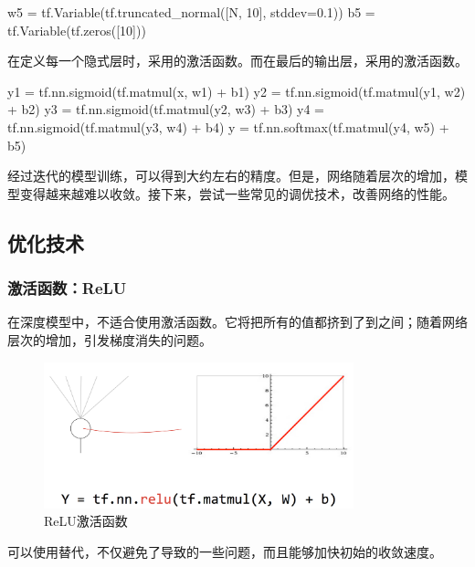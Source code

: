 \begin{content}
\begin{leftbar}
\begin{python}
w5 = tf.Variable(tf.truncated_normal([N, 10], stddev=0.1)) 
b5 = tf.Variable(tf.zeros([10]))
\end{python}
\end{leftbar}

在定义每一个隐式层时，采用的激活函数。而在最后的输出层，采用的激活函数。

\begin{leftbar}
\begin{python}
y1 = tf.nn.sigmoid(tf.matmul(x,  w1) + b1)
y2 = tf.nn.sigmoid(tf.matmul(y1, w2) + b2)
y3 = tf.nn.sigmoid(tf.matmul(y2, w3) + b3)
y4 = tf.nn.sigmoid(tf.matmul(y3, w4) + b4)
y  = tf.nn.softmax(tf.matmul(y4, w5) + b5)
\end{python}
\end{leftbar}

经过迭代的模型训练，可以得到大约左右的精度。但是，网络随着层次的增加，模型变得越来越难以收敛。接下来，尝试一些常见的调优技术，改善网络的性能。

\subsection{优化技术}

\subsubsection{激活函数：ReLU}

在深度模型中，不适合使用激活函数。它将把所有的值都挤到了到之间；随着网络层次的增加，引发梯度消失的问题。

\begin{figure}[H]
\centering
\includegraphics[width=0.8\textwidth]{figures/mnist-relu.png}
\caption{ReLU激活函数}
 \label{fig:mnist-relu}
\end{figure}

可以使用替代，不仅避免了导致的一些问题，而且能够加快初始的收敛速度。


\end{content}
